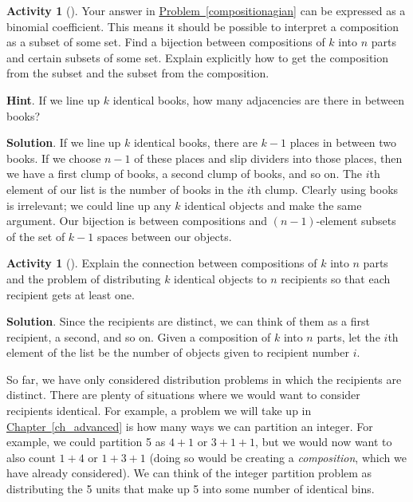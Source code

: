 \documentclass[10pt,]{book}
\theoremstyle{plain}
\theoremstyle{definition}
\theoremstyle{definition}
\theoremstyle{definition}
\newtheorem{activity}[project]{Activity}
\theoremstyle{definition}
\numberwithin{equation}{chapter}
\begin{document}
\begin{activity}[]\label{activity-72}
\hypertarget{p-771}{}%
Your answer in \hyperref[compositionagian]{Problem~\ref{compositionagian}} can be expressed as a binomial coefficient. This means it should be possible to interpret a composition as a subset of some set. Find a bijection between compositions of \(k\) into \(n\) parts and certain subsets of some set.  Explain explicitly how to get the composition from the subset and the subset from the composition.%
\par\smallskip%
\noindent\textbf{Hint}.\hypertarget{hint-64}{}\quad%
\hypertarget{p-772}{}%
If we line up \(k\) identical books, how many adjacencies are there in between books?%
\par\smallskip%
\noindent\textbf{Solution}.\hypertarget{solution-73}{}\quad%
\hypertarget{p-773}{}%
If we line up \(k\) identical books, there are \(k-1\) places in between two books. If we choose \(n-1\) of these places and slip dividers into those places, then we have a first clump of books, a second clump of books, and so on. The \(i\)th element of our list is the number of books in the \(i\)th clump. Clearly using books is irrelevant; we could line up any \(k\) identical objects and make the same argument. Our bijection is between compositions and \((n-1)\)-element subsets of the set of \(k-1\) spaces between our objects.%
\end{activity}
\begin{activity}[]\label{activity-73}
\hypertarget{p-774}{}%
Explain the connection between compositions of \(k\) into \(n\) parts and the problem of distributing \(k\) identical objects to \(n\) recipients so that each recipient gets at least one.%
\par\smallskip%
\noindent\textbf{Solution}.\hypertarget{solution-74}{}\quad%
\hypertarget{p-775}{}%
Since the recipients are distinct, we can think of them as a first recipient, a second, and so on. Given a composition of \(k\) into \(n\) parts, let the \(i\)th element of the list be the number of objects given to recipient number \(i\).%
\end{activity}
\hypertarget{p-776}{}%
So far, we have only considered distribution problems in which the recipients are distinct.  There are plenty of situations where we would want to consider recipients identical.  For example, a problem we will take up in \hyperref[ch_advanced]{Chapter~\ref{ch_advanced}} is how many ways we can partition an integer.  For example, we could partition 5 as \(4+1\) or \(3+1+1\), but we would now want to also count \(1+4\) or \(1+3+1\) (doing so would be creating a \emph{composition}, which we have already considered).  We can think of the integer partition problem as distributing the 5 units that make up 5 into some number of identical bins.%
\end{document}
